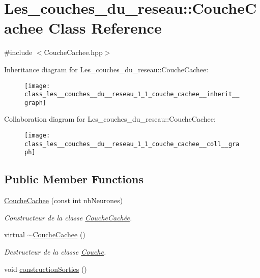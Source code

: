 \hypertarget{class_les__couches__du__reseau_1_1_couche_cachee}{}\section{Les\+\_\+couches\+\_\+du\+\_\+reseau\+:\+:Couche\+Cachee Class Reference}
\label{class_les__couches__du__reseau_1_1_couche_cachee}


{\ttfamily \#include $<$Couche\+Cachee.\+hpp$>$}



Inheritance diagram for Les\+\_\+couches\+\_\+du\+\_\+reseau\+:\+:Couche\+Cachee\+:\nopagebreak
\begin{figure}[H]
\begin{center}
\leavevmode
\texttt{[image: class\_les\_\_couches\_\_du\_\_reseau\_1\_1\_couche\_cachee\_\_inherit\_\_graph]}
\end{center}
\end{figure}


Collaboration diagram for Les\+\_\+couches\+\_\+du\+\_\+reseau\+:\+:Couche\+Cachee\+:\nopagebreak
\begin{figure}[H]
\begin{center}
\leavevmode
\texttt{[image: class\_les\_\_couches\_\_du\_\_reseau\_1\_1\_couche\_cachee\_\_coll\_\_graph]}
\end{center}
\end{figure}
\subsection*{Public Member Functions}
\begin{DoxyCompactItemize}
\item 
\hyperlink{class_les__couches__du__reseau_1_1_couche_cachee_ae721a71bbab8bf2f9cc0f8ce581844da}{Couche\+Cachee} (const int nb\+Neurones)
\begin{DoxyCompactList}\small\item\em Constructeur de la classe \hyperlink{class_couche_cach_xC3_xA9e}{Couche\+Cachée}. \end{DoxyCompactList}\item 
virtual \hyperlink{class_les__couches__du__reseau_1_1_couche_cachee_a6277c5f276d60ed48d0a67768bab30d6}{$\sim$\+Couche\+Cachee} ()
\begin{DoxyCompactList}\small\item\em Destructeur de la classe \hyperlink{class_les__couches__du__reseau_1_1_couche}{Couche}. \end{DoxyCompactList}\item 
void \hyperlink{class_les__couches__du__reseau_1_1_couche_cachee_aa94b46e05fe06440357e805da89a463d}{construction\+Sorties} ()
\end{DoxyCompactItemize}



